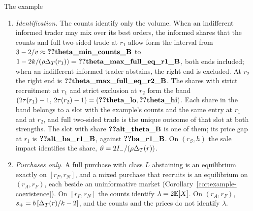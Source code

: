 \begin{named}{The example}
\begin{enumerate}[label=(\alph*),leftmargin=2em]
the price gap, both impacts, the price gap and the weighted impact difference rise strictly with \(r\). On
\((r_C,h)\), the entry component and the weighted impact difference are zero, and the class component, both impacts
and the price gap rise strictly. At \(r_1\) the class component is \(\reg{ba_class_r1_B}\) and the entry component
\(\reg{ba_entry_r1_B}\), so the price gap is \(\reg{ba_r1_B}\), of which the entry component is
\(\reg{ba_share_r1_B}\); the weighted impact difference \(\E[P(X)]-P(0)\) is \(\reg{wtest_r1_B}\). With a hidden price,
the price gap at \(r_1\) is the class component \(\reg{ba_class_r1_B}\). At \(r_C\) the price gap falls from
\(\reg{ba_rC_left_B}\) to \(\reg{ba_rC_right_B}\), by \(\reg{ba_jump_rC_B}\), and at \(r_2\) it is the class component
\(\reg{ba_r2_B}\). When an indifferent informed trader may mix over its best orders and an indifferent high-cost rival
may prepare with any probability, entry after a purchase
at \(r_C\) can take any value in \([\rho,1]\), and the price gap at \(r_C\) any value from \(\reg{ba_rC_right_B}\)
to \(\reg{ba_rC_left_B}\).
\item \emph{Identification.} The counts identify only the volume. When an indifferent informed trader may mix over its best
orders, the informed shares that the counts and full two-sided trade at \(r_1\) allow form the interval from
\(3-2/v\approx\reg{theta_min_counts_B}\) to \(1-2k/(\rho\DT(r_1))=\reg{theta_max_full_eq_r1_B}\), both ends
included; when an indifferent informed trader abstains, the right end is excluded. At \(r_2\) the right end is
\(\reg{theta_max_full_eq_r2_B}\). The shares with strict recruitment at \(r_1\) and strict exclusion at \(r_2\) form
the band \((2\tau(r_1)-1,\,2\tau(r_2)-1)=(\reg{theta_lo},\reg{theta_hi})\). Each share in the band belongs to a slot
with the example's counts and the same entry at \(r_1\) and at \(r_2\), and full two-sided trade is the unique outcome
of that slot at both strengths. The slot with share \(\reg{alt_theta_B}\) is one of them; its price gap at \(r_1\)
is \(\reg{alt_ba_r1_B}\), against \(\reg{ba_r1_B}\). On \((r_S,h)\) the sale impact identifies the share,
\(\vartheta=2I_-/(\rho\Delta_T(r))\).
\item \emph{Purchases only.} A full purchase with class \(L\) abstaining is an equilibrium exactly on \([r_F,r_N]\),
and a mixed purchase that recruits is an equilibrium on \((r_A,r_F)\), each beside an uninformative market
(Corollary~\ref{cor:example-coexistence}). On \([r_F,r_N]\) the counts identify \(\lambda=2\mathbb{E}[X]\). On \((r_A,r_F)\),
\(s_+=b\,[\Delta_T(r)/k-2]\), and the counts and the prices do not identify \(\lambda\).

\end{enumerate}
\end{named}
